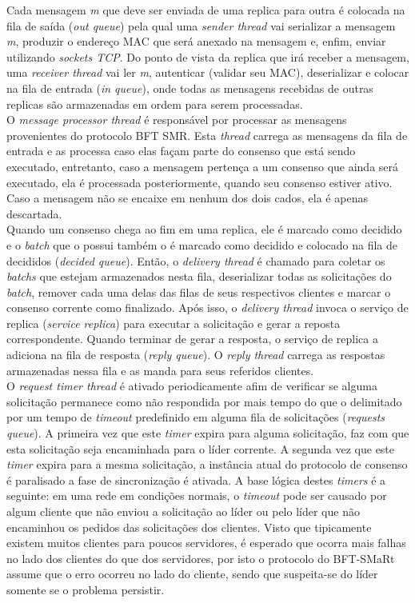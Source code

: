 	Cada mensagem \textit{m} que deve ser enviada de uma replica para outra é colocada na fila de saída (\textit{out queue}) pela qual uma \textit{sender thread} vai serializar a mensagem \textit{m}, produzir o endereço MAC que será anexado na mensagem e, enfim, enviar utilizando \textit{sockets TCP}. Do ponto de vista da replica que irá receber a mensagem, uma \textit{receiver thread} vai ler \textit{m}, autenticar (validar seu MAC), deserializar e colocar na fila de entrada (\textit{in queue}), onde todas as mensagens recebidas de outras replicas são armazenadas em ordem para serem processadas.  \\
	
	O \textit{message processor thread} é responsável por processar as mensagens provenientes do protocolo BFT SMR. Esta \textit{thread} carrega as mensagens da fila de entrada e as processa caso elas façam parte do consenso que está sendo executado, entretanto, caso a mensagem pertença a um consenso que ainda será executado, ela é processada posteriormente, quando seu consenso estiver ativo. Caso a mensagem não se encaixe em nenhum dos dois cados, ela é apenas descartada. \\
	
	 Quando um consenso chega ao fim em uma replica, ele é marcado como decidido e o \textit{batch} que o possui também o é marcado como decidido e colocado na fila de decididos (\textit{decided queue}). Então, o \textit{delivery thread} é chamado para coletar os \textit{batchs} que estejam armazenados nesta fila, deserializar todas as solicitações do \textit{batch}, remover cada uma delas das filas de seus respectivos clientes e marcar o  consenso corrente como finalizado. Após isso, o \textit{delivery thread} invoca o serviço de replica (\textit{service replica}) para executar a solicitação e gerar a reposta correspondente. Quando terminar de gerar a resposta, o serviço de replica a adiciona na fila de resposta (\textit{reply queue}). O \textit{reply thread} carrega as respostas armazenadas nessa fila e as manda para seus referidos clientes. \\
	 
	 O \textit{request timer thread} é ativado periodicamente afim de verificar se alguma solicitação permanece como não respondida por mais tempo do que o delimitado por um tempo de \textit{timeout} predefinido em alguma fila de solicitações (\textit{requests queue}). A primeira vez que este \textit{timer} expira para alguma solicitação, faz com que esta solicitação seja encaminhada para o líder corrente. A segunda vez que este \textit{timer} expira para a mesma solicitação, a instância atual do protocolo de consenso é paralisado a fase de sincronização é ativada. A base lógica destes \textit{timers} é a seguinte: em uma rede em condições normais, o \textit{timeout} pode ser causado por algum cliente que não enviou a solicitação ao líder ou pelo líder que não encaminhou os pedidos das solicitações dos clientes. Visto que tipicamente existem muitos clientes para poucos servidores, é esperado que ocorra mais falhas no lado dos clientes do que dos servidores, por isto o protocolo do BFT-SMaRt assume que o erro ocorreu no lado do cliente, sendo que suspeita-se do líder somente se o problema persistir. \\
	 
